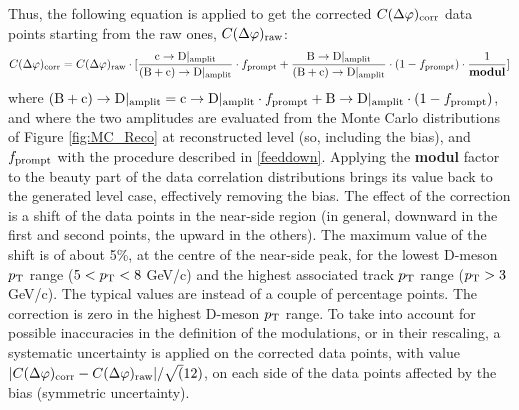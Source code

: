 Thus, the following equation is applied to get the corrected $C(\Delta\varphi)_{\rm corr}$ data points starting from the raw ones, $C(\Delta\varphi)_{\rm raw}$:
\begin{equation}
C(\Delta\varphi)_{\rm corr} = C(\Delta\varphi)_{\rm raw} \cdot [\frac{{\rm c}\rightarrow{\rm D}|_{\rm amplit}}{{\rm (B+c)}\rightarrow{\rm D}|_{\rm amplit}} \cdot f_{\rm prompt} + \frac{{\rm B}\rightarrow{\rm D}|_{\rm amplit}}{{\rm (B+c)}\rightarrow{\rm D}|_{\rm amplit}} \cdot (1-f_{\rm prompt})\cdot\frac{1}{\bf modul}]
\end{equation}
where ${\rm (B+c)}\rightarrow{\rm D}|_{\rm amplit} = {\rm c}\rightarrow{\rm D}|_{\rm amplit} \cdot f_{\rm prompt} + {\rm B}\rightarrow{\rm D}|_{\rm amplit} \cdot (1-f_{\rm prompt})$, and where the two amplitudes are evaluated from the Monte Carlo distributions of Figure \ref{fig:MC_Reco} at reconstructed level (so, including the bias), and $f_{\rm prompt}$ with the procedure described in \ref{feeddown}.
Applying the {\bf modul} factor to the beauty part of the data correlation distributions brings its value back to the generated level case, effectively removing the bias.
The effect of the correction is a shift of the data points in the near-side region (in general, downward in the first and second points, the upward in the others). The maximum value of the shift is of about 5\%, at the centre of the near-side peak, for the lowest D-meson $p_{\rm T}$ range ($5 < p_{\rm T} < 8$ GeV/c) and the highest associated track $p_{\rm T}$ range ($p_{\rm T} > 3$ GeV/c). The typical values are instead of a couple of percentage points. The correction is zero in the highest D-meson $p_{\rm T}$ range.
To take into account for possible inaccuracies in the definition of the modulations, or in their rescaling, a systematic uncertainty is  applied on the corrected data points, with value $|C(\Delta\varphi)_{\rm corr} - C(\Delta\varphi)_{\rm raw}|/\sqrt(12)$, on each side of the data points affected by the bias (symmetric uncertainty).

\clearpage
%
